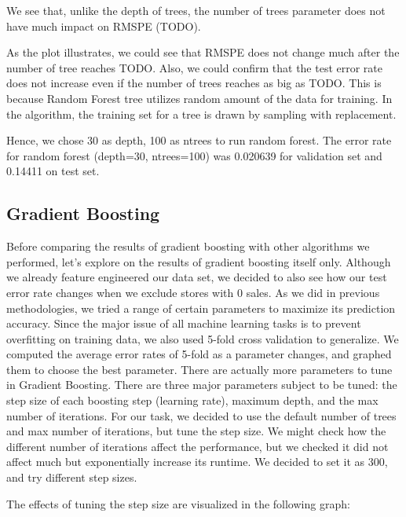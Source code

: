 \documentclass[letterpaper,twocolumn,11pt]{article}
\begin{document}
We see that, unlike the depth of trees, the number of trees parameter does not have much impact on RMSPE (TODO).

As the plot illustrates, we could see that RMSPE does not change much after the number of tree reaches TODO. Also, we could confirm that the test error rate does not increase even if the number of trees reaches as big as TODO. This is because Random Forest tree utilizes random amount of the data for training. In the algorithm, the training set for a tree is drawn by sampling with replacement.

Hence, we chose 30 as depth, 100 as ntrees to run random forest. The error rate for random forest (depth=30, ntrees=100) was 0.020639 for validation set and 0.14411 on test set.

\subsection{Gradient Boosting}
Before comparing the results of gradient boosting with other algorithms we performed, let's explore on the results of gradient boosting itself only. Although we already feature engineered our data set, we decided to also see how our test error rate changes when we exclude stores with 0 sales. As we did in previous methodologies, we tried a range of certain parameters to maximize its prediction accuracy. Since the major issue of all machine learning tasks is to prevent overfitting on training data, we also used 5-fold cross validation to generalize. We computed the average error rates of 5-fold as a parameter changes, and graphed them to choose the best parameter. There are actually more parameters to tune in Gradient Boosting. There are three major parameters subject to be tuned: the step size of each boosting step (learning rate), maximum depth, and the max number of iterations. For our task, we decided to use the default number of trees and max number of iterations, but tune the step size. We might check how the different number of iterations affect the performance, but we checked it did not affect much but exponentially increase its runtime. We decided to set it as 300, and try different step sizes. 

The effects of tuning the step size are visualized in the following graph:
\end{document}
